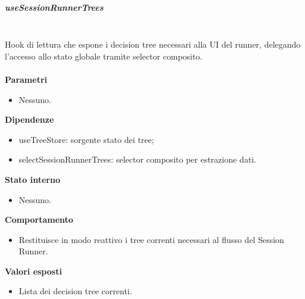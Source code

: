 \documentclass[a4paper,12pt]{article}
\begin{document}
                \subparagraph{useSessionRunnerTrees}\mbox{}\\
                Hook di lettura che espone i decision tree necessari alla UI del runner, delegando l'accesso allo stato globale tramite selector composito.\\\\
                \textbf{Parametri}
                \begin{itemize}
                    \item Nessuno.
                \end{itemize}
                \textbf{Dipendenze}
                \begin{itemize}
                    \item {\ttfamily useTreeStore}: sorgente stato dei tree;
                    \item {\ttfamily selectSessionRunnerTrees}: selector composito per estrazione dati.
                \end{itemize}
                \textbf{Stato interno}
                \begin{itemize}
                    \item Nessuno.
                \end{itemize}
                \textbf{Comportamento}
                \begin{itemize}
                    \item Restituisce in modo reattivo i tree correnti necessari al flusso del Session Runner.
                \end{itemize}
                \textbf{Valori esposti}
                \begin{itemize}
                    \item Lista dei decision tree correnti.
                \end{itemize}
                
\end{document}

